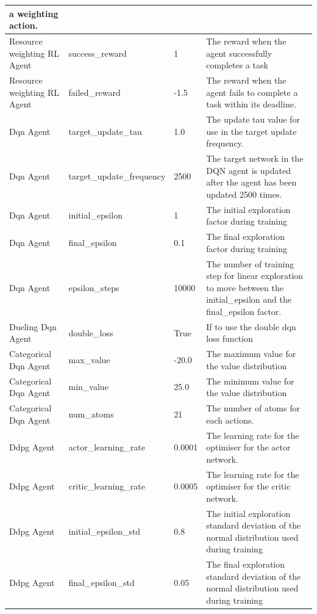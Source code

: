 \begin{longtable}{|p{2.5cm}|p{3cm}|p{3cm}|p{4cm}|}
            a weighting action. \\ \hline
        Resource weighting RL Agent & success\_reward & 1 & The reward when the agent successfully completes a task
            \\ \hline
        Resource weighting RL Agent & failed\_reward & -1.5 & The reward when the agent fails to complete a task within
            its deadline. \\ \hline
        Dqn Agent & target\_update\_tau & 1.0 & The update tau value for use in the target update frequency. \\ \hline
        Dqn Agent & target\_update\_frequency & 2500 & The target network in the DQN agent is updated after the agent
            has been updated 2500 times. \\ \hline
        Dqn Agent & initial\_epsilon & 1 & The initial exploration factor during training \\ \hline
        Dqn Agent & final\_epsilon & 0.1 & The final exploration factor during training \\ \hline
        Dqn Agent & epsilon\_steps & 10000 & The number of training step for linear exploration to move between the
            initial\_epsilon and the final\_epsilon factor. \\ \hline
        Dueling Dqn Agent & double\_loss & True & If to use the double dqn loss function \\ \hline \hline
        Categorical Dqn Agent & max\_value & -20.0 & The maximum value for the value distribution \\ \hline
        Categorical Dqn Agent & min\_value & 25.0 & The minimum value for the value distribution \\ \hline
        Categorical Dqn Agent & num\_atoms & 21 & The number of atoms for each actions. \\ \hline \hline
        Ddpg Agent & actor\_learning\_rate & 0.0001 & The learning rate for the optimiser for the actor network. \\ \hline
        Ddpg Agent & critic\_learning\_rate & 0.0005 & The learning rate for the optimiser for the critic network. \\ \hline
        Ddpg Agent & initial\_epsilon\_std & 0.8 & The initial exploration standard deviation of the normal distribution
            used  during training \\ \hline
        Ddpg Agent & final\_epsilon\_std & 0.05 & The final exploration standard deviation of the normal distribution
            used  during training \\ \hline

\end{longtable}
